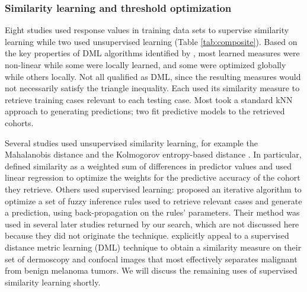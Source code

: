 \documentclass[sn-mathphys,Numbered,pdflatex]{sn-jnl}
\theoremstyle{remark}
\theoremstyle{definition}
\newcommand{\hl}[1]{#1}
\begin{document}
\subsubsection{Similarity learning and threshold
optimization}\label{similarity-learning-and-threshold-optimization}

\hl{Eight} studies used response values in training data sets to
supervise similarity learning while two used unsupervised learning
(Table \ref{tab:composite}). Based on the key properties of DML
algorithms identified by \citet{Bellet2014}, most learned measures were
non-linear while some were locally learned, and some were optimized
globally while others locally. Not all qualified as DML, since the
resulting measures would not necessarily satisfy the triangle
inequality. Each used its similarity measure to retrieve training cases
relevant to each testing case. \hl{Most} took a standard \hl{kNN}
approach to generating predictions; \hl{two}
\citep{Vilhena2016, Tang2021} fit predictive models to the retrieved
cohorts.

Several studies used unsupervised similarity learning, for example the
Mahalanobis distance \citep{Lowsky2013} and the Kolmogorov entropy-based
distance \citep{Elter2007}. In particular, \citet{Yearwood1997} defined
similarity as a weighted sum of differences in predictor values and used
linear regression to optimize the weights for the predictive accuracy of
the cohort they retrieve. Others used supervised learning:
\citet{Song2006} proposed an iterative algorithm to optimize a set of
fuzzy inference rules used to retrieve relevant cases and generate a
prediction, using back-propagation on the rules' parameters. Their
method was used in several later studies returned by our search, which
are not discussed here because they did not originate the technique.
\citet{Nicolas2014} explicitly appeal to a supervised distance metric
learning (DML) technique \citep{Xing2002} to obtain a similarity measure
on their set of dermoscopy and confocal images that most effectively
separates malignant from benign melanoma tumors. We will discuss the
remaining uses of supervised similarity learning shortly.
\end{document}
